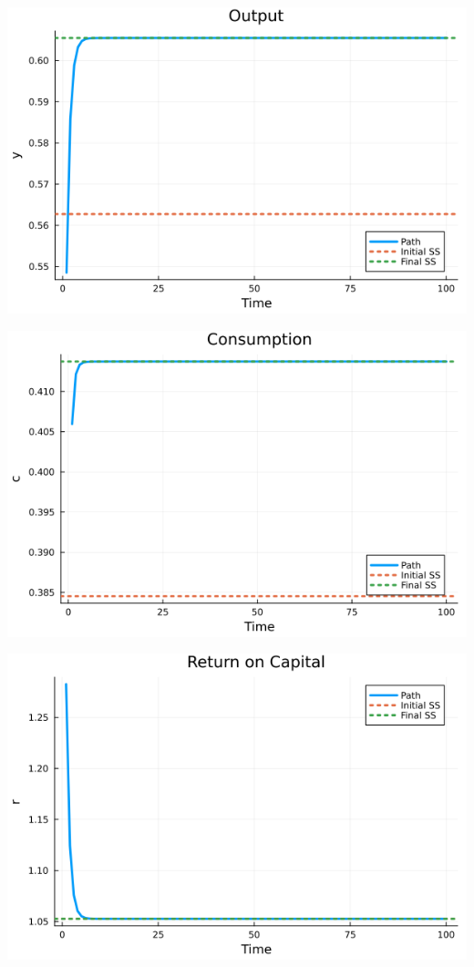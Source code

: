 \documentclass[12pt]{article}
\begin{document}
\begin{center}
    \includegraphics*[scale = 0.5]{fig2.png}
\end{center}

\begin{center}
    \includegraphics*[scale = 0.5]{fig3.png}
\end{center}

\begin{center}
    \includegraphics*[scale = 0.5]{fig4.png}
\end{center}
\end{document}
